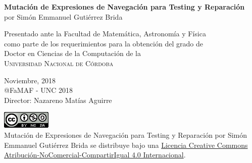 \begin{titlepage}

\begin{center}
{\LARGE \textbf{Mutaci\'on de Expresiones de Navegaci\'on para Testing y Reparaci\'on}}\\ 
\vspace{4mm}
{\Large por Sim\'on Emmanuel Guti\'errez Brida}\\

\vspace{50mm}

Presentado ante la Facultad de Matem\'atica, Astronom\'ia y F\'isica\\
como parte de los requerimientos para la obtenci\'on del grado de\\
Doctor en Ciencias de la Computaci\'on de la\\
\textsc{Universidad Nacional de C\'ordoba}\\
 
\vspace{50mm}

Noviembre, 2018\\
@FaMAF - UNC 2018\\
{\Large Director: Nazareno Mat\'ias Aguirre}

\vspace{10mm}
\href{https://licensebuttons.net/l/by-nc-sa/4.0/88x31.png}{\includegraphics{images/licencia-famaf.png}}\\
{Mutaci\'on de Expresiones de Navegaci\'on para Testing y Reparaci\'on por Sim\'on Emmanuel Guti\'errez Brida se distribuye bajo una \href{https://creativecommons.org/licenses/by-nc-sa/4.0/deed.es_ES}{Licencia Creative Commons Atribución-NoComercial-CompartirIgual 4.0 Internacional}.}
\end{center}  
\end{titlepage} 




